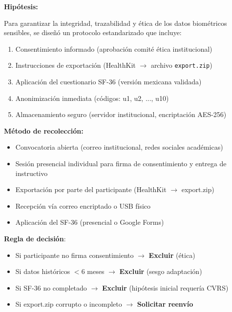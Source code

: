 \documentclass[12pt,letterpaper,twoside]{report}
\begin{document}
\begin{hipotesisbox}
\textbf{Hipótesis:}

Para garantizar la integridad, trazabilidad y ética de los datos biométricos sensibles, se diseñó un protocolo estandarizado que incluye:
\begin{enumerate}[noitemsep]
    \item Consentimiento informado (aprobación comité ética institucional)
    \item Instrucciones de exportación (HealthKit $\to$ archivo \texttt{export.zip})
    \item Aplicación del cuestionario SF-36 (versión mexicana validada)
    \item Anonimización inmediata (códigos: u1, u2, ..., u10)
    \item Almacenamiento seguro (servidor institucional, encriptación AES-256)
\end{enumerate}
\end{hipotesisbox}

\begin{estadisticobox}
\textbf{Método de recolección:}

\begin{itemize}[noitemsep]
    \item Convocatoria abierta (correo institucional, redes sociales académicas)
    \item Sesión presencial individual para firma de consentimiento y entrega de instructivo
    \item Exportación por parte del participante (HealthKit $\to$ export.zip)
    \item Recepción vía correo encriptado o USB físico
    \item Aplicación del SF-36 (presencial o Google Forms)
\end{itemize}
\end{estadisticobox}

\begin{reglabox}
\textbf{Regla de decisión}:

\begin{itemize}[noitemsep]
    \item Si participante no firma consentimiento $\to$ \textbf{Excluir} (ética)
    \item Si datos históricos $< 6$ meses $\to$ \textbf{Excluir} (sesgo adaptación)
    \item Si SF-36 no completado $\to$ \textbf{Excluir} (hipótesis inicial requería CVRS)
    \item Si export.zip corrupto o incompleto $\to$ \textbf{Solicitar reenvío}
\end{itemize}
\end{reglabox}
\end{document}
